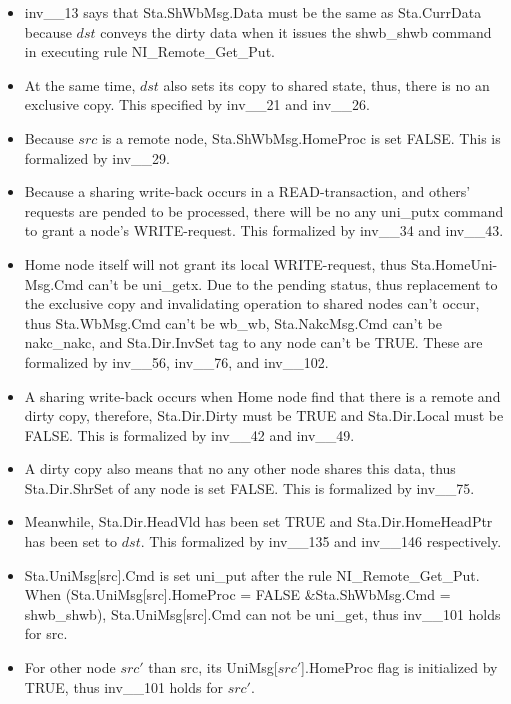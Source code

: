 \documentclass{llncs}
\begin{document}
\begin{itemize}
\item inv\_\_13 says that Sta.ShWbMsg.Data must be the same as Sta.CurrData because $dst$ conveys the dirty data when it issues the  shwb\_shwb command in executing rule NI\_Remote\_Get\_Put.
\item At the same time, $dst$ also sets its copy to shared state, thus, there is no an exclusive copy. This specified by inv\_\_21 and inv\_\_26.
\item Because   $src$ is a remote node, Sta.ShWbMsg.HomeProc is set FALSE. This is formalized by inv\_\_29.
\item Because  a sharing write-back occurs in a READ-transaction, and others' requests are pended to be processed, there will be no any uni\_putx command  to grant a node's WRITE-request. This formalized by inv\_\_34 and inv\_\_43.
\item Home node itself will not grant its local WRITE-request, thus Sta.HomeUni-Msg.Cmd  can't be  uni\_getx. Due to the pending status, thus replacement to the exclusive copy and invalidating operation to shared nodes can't occur, thus Sta.WbMsg.Cmd can't be wb\_wb, Sta.NakcMsg.Cmd can't be nakc\_nakc, and Sta.Dir.InvSet tag to any node can't be TRUE. These are formalized by inv\_\_56, inv\_\_76, and inv\_\_102.
\item A sharing write-back occurs when Home node find that there is a remote and dirty copy, therefore, Sta.Dir.Dirty must be TRUE and Sta.Dir.Local must be FALSE. This is formalized by inv\_\_42 and inv\_\_49.
\item A dirty copy also means that no any other node shares this data, thus Sta.Dir.ShrSet of any node is set FALSE. This is formalized by inv\_\_75.
\item Meanwhile, Sta.Dir.HeadVld has been set TRUE and Sta.Dir.HomeHeadPtr has been set to $dst$. This formalized by inv\_\_135 and inv\_\_146 respectively.
\item Sta.UniMsg[src].Cmd  is set uni\_put after the rule NI\_Remote\_Get\_Put. When (Sta.UniMsg[src].HomeProc = FALSE \&Sta.ShWbMsg.Cmd = shwb\_shwb), Sta.UniMsg[src].Cmd can not be uni\_get, thus inv\_\_101 holds for src.
\item For other node $src'$ than src, its UniMsg[$src'$].HomeProc flag is initialized by TRUE,  thus inv\_\_101 holds for $src'$.
\end{itemize}
\end{document}
